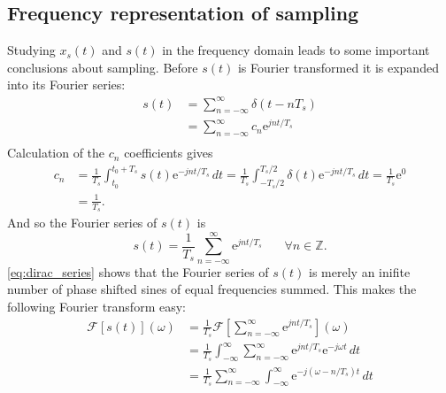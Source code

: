 \subsection{Frequency representation of sampling}
Studying $x_s(t)$ and $s(t)$ in the frequency domain leads to some important conclusions about sampling. Before $s(t)$ is Fourier transformed it is expanded into its Fourier series:
\begin{align*}
s(t)&=\sum_{n=-\infty}^{\infty}\delta(t-nT_s)\\
&=\sum_{n=-\infty}^{\infty}c_n\mathrm{e}^{j nt/T_s}\\
\end{align*}
Calculation of the $c_n$ coefficients gives
\begin{align*}
c_n&=\frac{1}{T_s}\int_{t_0}^{t_0+T_s}\!s(t)\mathrm{e}^{-jnt/T_s}\,dt=\frac{1}{T_s}\int_{-T_s/2}^{T_s/2}\!\delta(t)\mathrm{e}^{-jnt/T_s}\,dt=\frac{1}{T_s}\mathrm{e}^0\\&=\frac{1}{T_s}.
\end{align*}
And so the Fourier series of $s(t)$ is
\begin{equation}\label{eq:dirac_series}
s(t)=\frac{1}{T_s}\sum_{n=-\infty}^{\infty}\mathrm{e}^{jnt/T_s}\phantom{mm}\forall n\in\mathbb{Z}.
\end{equation}
\eqref{eq:dirac_series} shows that the Fourier series of $s(t)$ is merely an inifite number of phase shifted sines of equal frequencies summed. This makes the following Fourier transform easy:
\begin{align}
\mathcal{F}[s(t)](\omega)&=\frac{1}{T_s}\mathcal{F}\left[\sum_{n=-\infty}^{\infty}\mathrm{e}^{jnt/T_s}\right](\omega)\nonumber\\
&=\frac{1}{T_s}\int_{-\infty}^{\infty}\!\sum_{n=-\infty}^{\infty}\mathrm{e}^{jnt/T_s}\mathrm{e}^{-j\omega t}\,dt\nonumber\\
&=\frac{1}{T_s}\sum_{n=-\infty}^{\infty}\int_{-\infty}^{\infty}\!\mathrm{e}^{-j(\omega-n/T_s)t}\,dt\label{eq:fourier_comb1}
\end{align}

